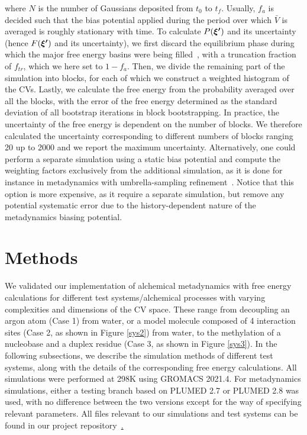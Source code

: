 \documentclass[journal=jacsat,manuscript=article]{achemso}
\newcommand{\bfv}[1]{{\mbox{\boldmath{$#1$}}}}
\begin{document}
where $N$ is the number of Gaussians deposited from $t_0$ to $t_f$. Usually, $f_a$ is decided such that the bias potential applied during the period over which $\bar{V}$ is averaged is roughly stationary with time. To calculate $P(\bfv{\xi'})$ and its uncertainty (hence $F(\bfv{\xi'})$ and its uncertainty), we first discard the equilibrium phase during which the major free energy basins were being filled~\cite{bussi2020using}, with a truncation fraction of $f_{tr}$, which we here set to $1-f_{a}$. Then, we divide the remaining part of the simulation into blocks, for each of which we construct a weighted histogram of the CVs. Lastly, we calculate the free energy from the probability averaged over all the blocks, with the error of the free energy determined as the standard deviation of all bootstrap iterations in block bootstrapping. In practice, the uncertainty of the free energy is dependent on the number of blocks. We therefore calculated the uncertainty corresponding to different numbers of blocks ranging 20 up to 2000 and we report the maximum uncertainty. Alternatively, one could perform a separate simulation using a static bias potential and compute the weighting factors exclusively from the additional simulation, as it is done for instance in metadynamics with umbrella-sampling refinement~\cite{babin2006free}. Notice that this option is more expensive, as it require a separate simulation, but remove any potential systematic error due to the history-dependent nature of the metadynamics biasing potential.

\section{Methods}\label{methods}
We validated our implementation of alchemical metadynamics with free energy calculations for different test systems/alchemical processes with varying complexities and dimensions of the CV space. These range from decoupling an argon atom (Case 1) from water, or a model molecule composed of 4 interaction sites (Case 2, as shown in Figure \ref{sys2}) from water, to the methylation of a nucleobase and a duplex residue (Case 3, as shown in Figure \ref{sys3}). In the following subsections, we describe the simulation methods of different test systems, along with the details of the corresponding free energy calculations. All simulations were performed at 298K using GROMACS 2021.4. For metadynamics simulations, either a testing branch based on PLUMED 2.7 or PLUMED 2.8 was used, with no difference between the two versions except for the way of specifying relevant parameters. All files relevant to our simulations and test systems can be found in our project repository~\href{https://github.com/shirtsgroup/alchemical_MetaD}. 
\end{document}
